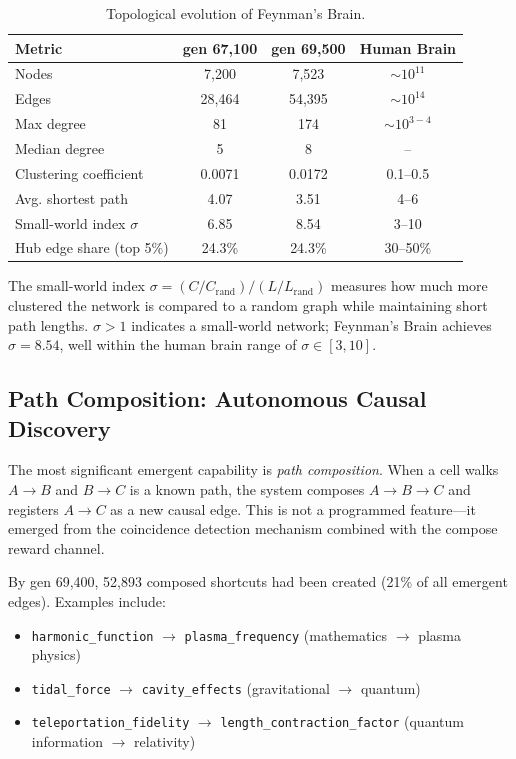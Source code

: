 \documentclass[aps,prl,reprint]{revtex4-2}
\begin{document}
\begin{table}[h]
\centering
\caption{Topological evolution of Feynman's Brain.}
\label{tab:topology}
\begin{tabular}{lccc}
\toprule
Metric & gen 67,100 & gen 69,500 & Human Brain \\
\midrule
Nodes & 7,200 & 7,523 & $\sim 10^{11}$ \\
Edges & 28,464 & 54,395 & $\sim 10^{14}$ \\
Max degree & 81 & 174 & $\sim 10^{3-4}$ \\
Median degree & 5 & 8 & -- \\
Clustering coefficient & 0.0071 & 0.0172 & 0.1--0.5 \\
Avg. shortest path & 4.07 & 3.51 & 4--6 \\
Small-world index $\sigma$ & 6.85 & 8.54 & 3--10 \\
Hub edge share (top 5\%) & 24.3\% & 24.3\% & 30--50\% \\
\bottomrule
\end{tabular}
\end{table}

The small-world index $\sigma = (C/C_{\text{rand}})/(L/L_{\text{rand}})$
measures how much more clustered the network is compared to a random graph
while maintaining short path lengths. $\sigma > 1$ indicates a small-world
network; Feynman's Brain achieves $\sigma = 8.54$, well within the human
brain range of $\sigma \in [3, 10]$.

\subsection{Path Composition: Autonomous Causal Discovery}

The most significant emergent capability is \emph{path composition}. When a
cell walks $A \rightarrow B$ and $B \rightarrow C$ is a known path, the
system composes $A \rightarrow B \rightarrow C$ and registers $A \rightarrow
C$ as a new causal edge. This is not a programmed feature---it emerged from
the coincidence detection mechanism combined with the compose reward channel.

By gen 69,400, 52,893 composed shortcuts had been created (21\% of all
emergent edges). Examples include:

\begin{itemize}
\item \texttt{harmonic\_function} $\rightarrow$ \texttt{plasma\_frequency}
  (mathematics $\rightarrow$ plasma physics)
\item \texttt{tidal\_force} $\rightarrow$ \texttt{cavity\_effects}
  (gravitational $\rightarrow$ quantum)
\item \texttt{teleportation\_fidelity} $\rightarrow$
  \texttt{length\_contraction\_factor}
  (quantum information $\rightarrow$ relativity)
\end{itemize}
\end{document}
